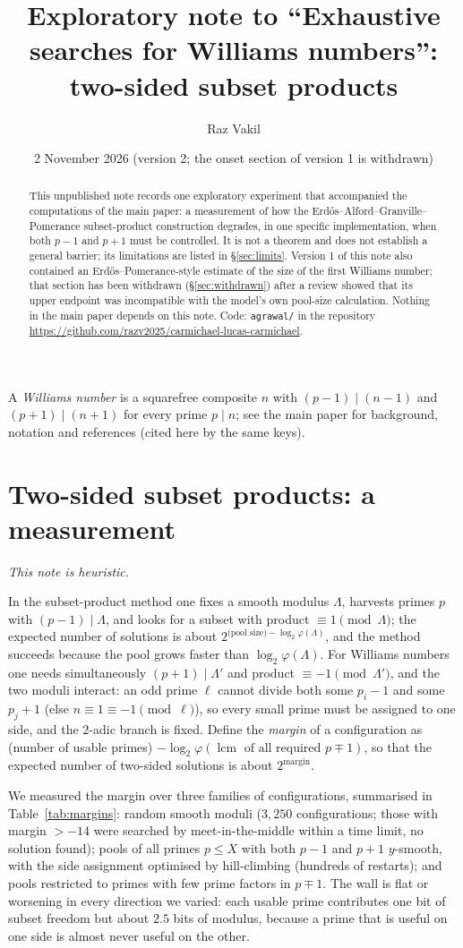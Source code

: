 \documentclass[11pt]{amsart}
\title[Exploratory note: two-sided subset products]{Exploratory note to ``Exhaustive searches for Williams numbers'':\\ two-sided subset products}
\author{Raz Vakil}\address{Tel Aviv, Israel}\email{Raz.Vakil@gmail.com}\date{2 November 2026 (version 2; the onset section of version 1 is withdrawn)}
\providecommand{\lcm}{\operatorname{lcm}}
\begin{document}
\begin{abstract}
This unpublished note records one exploratory experiment that accompanied the computations of the main paper: a measurement of how the Erd\H{o}s--Alford--Granville--Pomerance subset-product construction degrades, in one specific implementation, when both $p-1$ and $p+1$ must be controlled. It is not a theorem and does not establish a general barrier; its limitations are listed in \S\ref{sec:limits}. Version 1 of this note also contained an Erd\H{o}s--Pomerance-style estimate of the size of the first Williams number; that section has been withdrawn (\S\ref{sec:withdrawn}) after a review showed that its upper endpoint was incompatible with the model's own pool-size calculation. Nothing in the main paper depends on this note. Code: \texttt{agrawal/} in the repository \url{https://github.com/razv2025/carmichael-lucas-carmichael}.
\end{abstract}
\maketitle
A \emph{Williams number} is a squarefree composite $n$ with $(p-1)\mid(n-1)$ and $(p+1)\mid(n+1)$ for every prime $p\mid n$; see the main paper for background, notation and references (cited here by the same keys).

\section{Two-sided subset products: a measurement}\label{sec:subset}
\emph{This note is heuristic.} 

In the subset-product method one fixes a smooth modulus $\Lambda$, harvests primes $p$ with $(p-1)\mid\Lambda$, and looks for a subset with product $\equiv1\pmod\Lambda$; the expected number of solutions is about $2^{\text{(pool size)}-\log_2\varphi(\Lambda)}$, and the method succeeds because the pool grows faster than $\log_2\varphi(\Lambda)$. For Williams numbers one needs simultaneously $(p+1)\mid\Lambda'$ and product $\equiv-1\pmod{\Lambda'}$, and the two moduli interact: an odd prime $\ell$ cannot divide both some $p_i-1$ and some $p_j+1$ (else $n\equiv1\equiv-1\pmod\ell$), so every small prime must be assigned to one side, and the $2$-adic branch is fixed. Define the \emph{margin} of a configuration as (number of usable primes) $-\log_2\varphi(\lcm\text{ of all required }p\mp1)$, so that the expected number of two-sided solutions is about $2^{\text{margin}}$.

We measured the margin over three families of configurations, summarised in Table~\ref{tab:margins}: random smooth moduli ($3{,}250$ configurations; those with margin $>-14$ were searched by meet-in-the-middle within a time limit, no solution found); pools of all primes $p\le X$ with both $p-1$ and $p+1$ $y$-smooth, with the side assignment optimised by hill-climbing (hundreds of restarts); and pools restricted to primes with few prime factors in $p\mp1$. The wall is flat or worsening in every direction we varied: each usable prime contributes one bit of subset freedom but about $2.5$ bits of modulus, because a prime that is useful on one side is almost never useful on the other.
\end{document}
